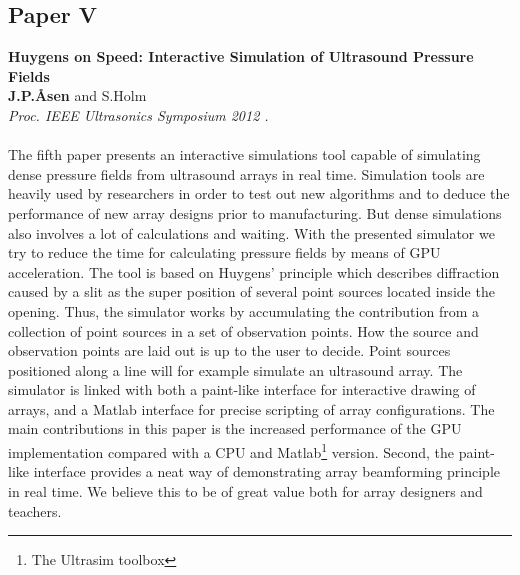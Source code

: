 \subsection{Paper V}
\textbf{Huygens on Speed: Interactive Simulation of Ultrasound Pressure Fields}\\
\textbf{J.\:P.\:\AA{}sen} and S.\:Holm\\
{\it Proc. IEEE Ultrasonics Symposium 2012 .}\\\\
The fifth paper presents an interactive simulations tool capable of simulating dense pressure fields from ultrasound arrays in real time. Simulation tools are heavily used by researchers in order to test out new algorithms and to deduce the performance of new array designs prior to manufacturing. But dense simulations also involves a lot of calculations and waiting. With the presented simulator we try to reduce the time for calculating pressure fields by means of GPU acceleration. The tool is based on Huygens' principle which describes diffraction caused by a slit as the super position of several point sources located inside the opening. Thus, the simulator works by accumulating the contribution from a collection of point sources in a set of observation points. How the source and observation points are laid out is up to the user to decide. Point sources positioned along a line will for example simulate an ultrasound array. The simulator is linked with both a paint-like interface for interactive drawing of arrays, and a Matlab interface for precise scripting of array configurations. The main contributions in this paper is the increased performance of the GPU implementation compared with a CPU and Matlab\footnote{The Ultrasim toolbox } version. Second, the paint-like interface provides a neat way of demonstrating array beamforming principle in real time. We believe this to be of great value both for array designers and teachers.

